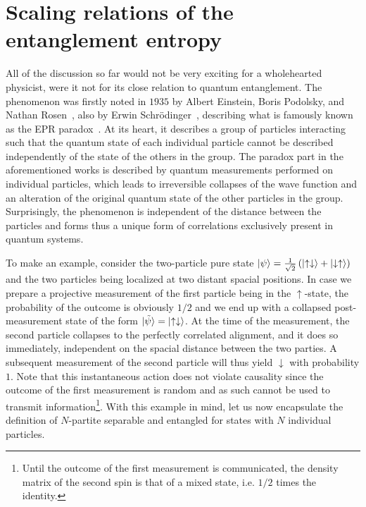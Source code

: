 \section{Scaling relations of the entanglement entropy}
\label{sec:scaling_relations_of_the_entanglement_entropy}
%
%
All of the discussion so far would not be very exciting for a wholehearted physicist, were it not for its close relation to quantum entanglement.
The phenomenon was firstly noted in $1935$ by Albert Einstein, Boris Podolsky, and Nathan Rosen~\cite{EPR1935}, also by Erwin Schrödinger~\cite{Schrdinger1935,Schrdinger1936}, describing what is famously known as the EPR paradox~\cite{Reid2009}.
At its heart, it describes a group of particles interacting such that the quantum state of each individual particle cannot be described independently of the state of the others in the group.
The paradox part in the aforementioned works is described by quantum measurements performed on individual particles, which leads to irreversible collapses of the wave function and an alteration of the original quantum state of the other particles in the group.
Surprisingly, the phenomenon is independent of the distance between the particles and forms thus a unique form of correlations exclusively present in quantum systems.

To make an example, consider the two-particle pure state $\ket{\psi}=\frac1{\sqrt2}\left( \ket{\uparrow\downarrow}+\ket{\downarrow\uparrow} \right)$ and the two particles being localized at two distant spacial positions.
In case we prepare a projective measurement of the first particle being in the $\uparrow$-state, the probability of the outcome is obviously $1/2$ and we end up with a collapsed post-measurement state of the form $\ket{\tilde\psi} = \ket{\uparrow\downarrow}$.
At the time of the measurement, the second particle collapses to the perfectly correlated alignment, and it does so immediately, independent on the spacial distance between the two parties.
A subsequent measurement of the second particle will thus yield $\downarrow$ with probability $1$.
Note that this instantaneous action does not violate causality since the outcome of the first measurement is random and as such cannot be used to transmit information\footnote{Until the outcome of the first measurement is communicated, the density matrix of the second spin is that of a mixed state, i.e. $1/2$ times the identity.}.
With this example in mind, let us now encapsulate the definition of $N$-partite separable and entangled for states with $N$ individual particles.

